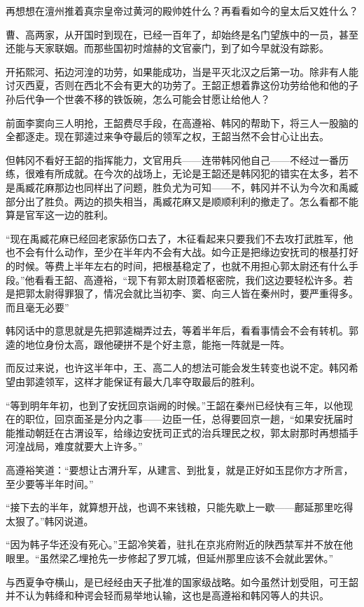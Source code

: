 再想想在澶州推着真宗皇帝过黄河的殿帅姓什么？再看看如今的皇太后又姓什么？

曹、高两家，从开国时到现在，已经一百年了，却始终是名门望族中的一员，甚至还能与天家联姻。而那些国初时煊赫的文官豪门，到了如今早就没有踪影。

开拓熙河、拓边河湟的功劳，如果能成功，当是平灭北汉之后第一功。除非有人能讨灭西夏，否则在西北不会有更大的功劳了。王韶正想着靠这份功劳给他和他的子孙后代争一个世袭不移的铁饭碗，怎么可能会甘愿让给他人？

前面李窦向三人明抢，王韶费尽手段，在高遵裕、韩冈的帮助下，将三人一股脑的全都逐走。现在郭逵过来争夺最后的领军之权，王韶当然不会甘心让出去。

但韩冈不看好王韶的指挥能力，文官用兵——连带韩冈他自己——不经过一番历练，很难有所成就。在今次的战场上，无论是王韶还是韩冈犯的错实在太多，若不是禹臧花麻那边也同样出了问题，胜负尤为可知——不，韩冈并不认为今次和禹臧部分出了胜负。两边的损失相当，禹臧花麻又是顺顺利利的撤走了。怎么看都不能算是官军这一边的胜利。

“现在禹臧花麻已经回老家舔伤口去了，木征看起来只要我们不去攻打武胜军，他也不会有什么动作，至少在半年内不会有大战。如今正是把缘边安抚司的根基打好的时候。等费上半年左右的时间，把根基稳定了，也就不用担心郭太尉还有什么手段。”他看看王韶、高遵裕，“现下有郭太尉顶着枢密院，我们这边要轻松许多。若是把郭太尉得罪狠了，情况会就比当初李、窦、向三人皆在秦州时，要严重得多。而且毫无必要”

韩冈话中的意思就是先把郭逵糊弄过去，等着半年后，看看事情会不会有转机。郭逵的地位身份太高，跟他硬拼不是个好主意，能拖一阵就是一阵。

而反过来说，也许这半年中，王、高二人的想法可能会发生转变也说不定。韩冈希望由郭逵领军，这样才能保证有最大几率夺取最后的胜利。

“等到明年年初，也到了安抚回京诣阙的时候。”王韶在秦州已经快有三年，以他现在的职位，回京面圣是分内之事——边臣一任，总得要回京一趟，“如果安抚届时能推动朝廷在古渭设军，给缘边安抚司正式的治兵理民之权，郭太尉那时再想插手河湟战局，难度就要大上许多。”

高遵裕笑道：“要想让古渭升军，从建言、到批复，就是正好如玉昆你方才所言，至少要等半年时间。”

“接下去的半年，就算想开战，也调不来钱粮，只能先歇上一歇——鄜延那里吃得太狠了。”韩冈说道。

“因为韩子华还没有死心。”王韶冷笑着，驻扎在京兆府附近的陕西禁军并不放在他眼里。“虽然梁乙埋抢先一步修起了罗兀城，但延州那里应该不会就此罢休。”

与西夏争夺横山，是已经经由天子批准的国家级战略。如今虽然计划受阻，可王韶并不认为韩绛和种谔会轻而易举地认输，这也是高遵裕和韩冈等人的共识。

